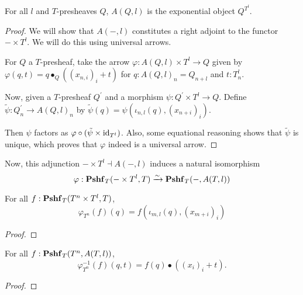 \begin{lemma}
  For all $ l $ and $ T $-presheaves $ Q $, $ A(Q, l) $ is the exponential object $ Q^{T^l} $.
\end{lemma}
\begin{proof}
  We will show that $ A(-, l) $ constitutes a right adjoint to the functor $ - \times T^l $. We will do this using universal arrows.

  For $ Q $ a $ T $-presheaf, take the arrow $ \varphi: A(Q, l) \times T^l \to Q $ given by $ \varphi(q, t) = q \bullet_Q ((x_{n, i})_i + t) $ for $ q: A(Q, l)_n = Q_{n + l} $ and $ t: T^l_n $.

  Now, given a $ T $-presheaf $ Q^\prime $ and a morphism $ \psi: Q^\prime \times T^l \to Q $. Define $ \tilde \psi: Q^\prime_n \to A(Q, l)_n $ by $ \tilde \psi(q) = \psi(\iota_{n, l}(q), (x_{n + i})_i) $.

  Then $ \psi $ factors as $ \varphi \circ (\tilde \psi \times \text{id}_{T^l}) $. Also, some equational reasoning shows that $ \tilde \psi $ is unique, which proves that $ \varphi $ indeed is a universal arrow.
\end{proof}

Now, this adjunction $ - \times T^l \dashv A(-, l) $ induces a natural isomorphism
\[ \varphi: \mathbf{Pshf}_{T}(- \times T^l, T) \xrightarrow{\sim} \mathbf{Pshf}_{T}(-, A(T, l)) \]
\begin{lemma}
  For all $ f: \mathbf{Pshf}_{T}(T^n \times T^l, T) $,
  \[ \varphi_{T^n}(f)(q) = f(\iota_{m, l}(q), (x_{m + i})_i) \]
\end{lemma}
\begin{proof}
  \TODO
\end{proof}

\begin{lemma}
  For all $ f: \mathbf{Pshf}_{T}(T^n, A(T, l)) $,
  \[ \varphi_{T^n}^{-1}(f)(q, t) = f(q) \bullet ((x_i)_i + t). \]
\end{lemma}
\begin{proof}
  \TODO
\end{proof}
